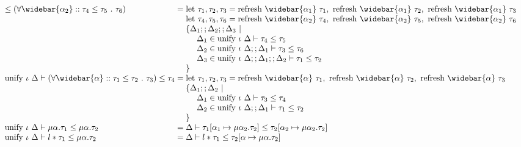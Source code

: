 \documentclass[sigplan,screen]{acmart}
\begin{document}
\begin{figure*}[h]
\[\begin{array}{l @{} l}
      \leq 
      (\forall \widebar{\alpha_2} :: \tau_4 \leq \tau_5\ .\ \tau_6)
      &{} = 
      \begin{array}[t]{@{} l}
        \text{let } \tau_1, \tau_2, \tau_3 = 
        \text{refresh } \widebar{\alpha_1}\ \tau_1,\ 
        \text{refresh } \widebar{\alpha_1}\ \tau_2,\ 
        \text{refresh } \widebar{\alpha_1}\ \tau_3
        \\
        \text{let } \tau_4, \tau_5, \tau_6 = 
        \text{refresh } \widebar{\alpha_2}\ \tau_4,\ 
        \text{refresh } \widebar{\alpha_2}\ \tau_5,\ 
        \text{refresh } \widebar{\alpha_2}\ \tau_6
        \\
        \{\Delta_1;;\Delta_2;;\Delta_3\ |
        \\ 
        \ \ \ \ \Delta_1 \in \text{unify } \iota\ \Delta \vdash \tau_4 \leq \tau_5
        \\ 
        \ \ \ \ \Delta_2 \in \text{unify } \iota\ \Delta;;\Delta_1 \vdash \tau_3 \leq \tau_6
        \\
        \ \ \ \ \Delta_3 \in \text{unify } \iota\ \Delta;;\Delta_1;;\Delta_2 \vdash \tau_1 \leq \tau_2
        \\
        \}
      \end{array}
      \\
      \text{unify } \iota\ \Delta \vdash
      (\forall \widebar{\alpha} :: \tau_1 \leq \tau_2\ .\ \tau_3)
      \leq 
      \tau_4
      &{} = 
      \begin{array}[t]{@{} l}
        \text{let } \tau_1, \tau_2, \tau_3 = 
        \text{refresh } \widebar{\alpha}\ \tau_1,\ 
        \text{refresh } \widebar{\alpha}\ \tau_2,\ 
        \text{refresh } \widebar{\alpha}\ \tau_3
        \\
        \{\Delta_1;;\Delta_2\ |
        \\ 
        \ \ \ \ \Delta_1 \in \text{unify } \iota\ \Delta \vdash \tau_3 \leq \tau_4
        \\
        \ \ \ \ \Delta_2 \in \text{unify } \iota\ \Delta;;\Delta_1 \vdash \tau_1 \leq \tau_2
        \\
        \}
      \end{array}
      \\
      \text{unify } \iota\ \Delta \vdash
      \mu \alpha . \tau_1 \leq \mu \alpha . \tau_2
      &{} = 
      \Delta \vdash 
      \tau_1[\alpha_1\mapsto\mu\alpha_2.\tau_2] \leq 
      \tau_2[\alpha_2\mapsto\mu\alpha_2.\tau_2]

      \\
      \text{unify } \iota\ \Delta \vdash
      l * \tau_1 \leq \mu \alpha . \tau_2
      &{} = 
      \Delta \vdash  
      l * \tau_1 \leq\tau_2[\alpha\mapsto\mu\alpha.\tau_2]


\end{array}\]
\end{figure*}
\end{document}
